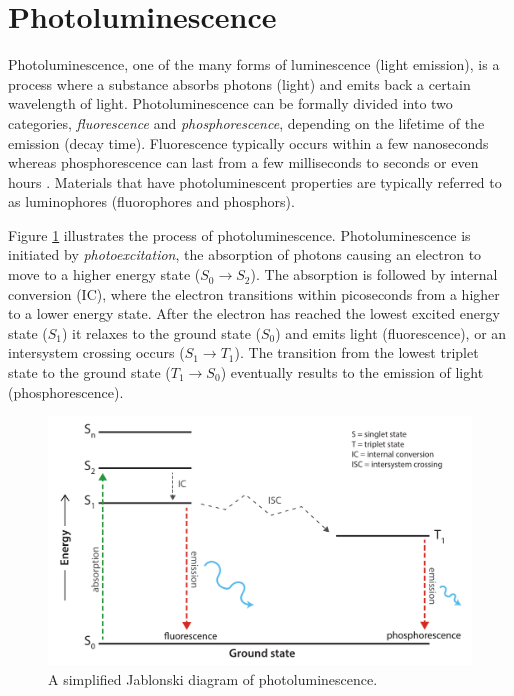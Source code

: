 \documentclass[thesis.tex]{subfiles}
\begin{document}
\section{Photoluminescence}
\label{section:photoluminescence}

Photoluminescence, one of the many forms of luminescence (light emission), is a process where a substance absorbs photons (light) and emits back a certain wavelength of light. Photoluminescence can be formally divided into two categories, \emph{fluorescence} and \emph{phosphorescence}, depending on the lifetime of the emission (decay time). Fluorescence typically occurs within a few nanoseconds whereas phosphorescence can last from a few milliseconds to seconds or even hours \cite{luminescence_basics}. Materials that have photoluminescent properties are typically referred to as luminophores (fluorophores and phosphors).

Figure \ref{figure:photoluminescence} illustrates the process of photoluminescence. Photoluminescence is initiated by \emph{photoexcitation}, the absorption of photons causing an electron to move to a higher energy state ($S_0 \rightarrow S_2$). The absorption is followed by internal conversion (IC), where the electron transitions within picoseconds from a higher to a lower energy state. After the electron has reached the lowest excited energy state ($S_1$) it relaxes to the ground state ($S_0$) and emits light (fluorescence), or an intersystem crossing occurs ($S_1 \rightarrow T_1$). The transition from the lowest triplet state to the ground state ($T_1 \rightarrow S_0$) eventually results to the emission of light (phosphorescence).

\begin{figure}[hb]
\centering \includegraphics[width=13.25cm]{images/photoluminescence.pdf}
\caption{A simplified Jablonski diagram of photoluminescence. \label{figure:photoluminescence}}
\end{figure}
\end{document}
